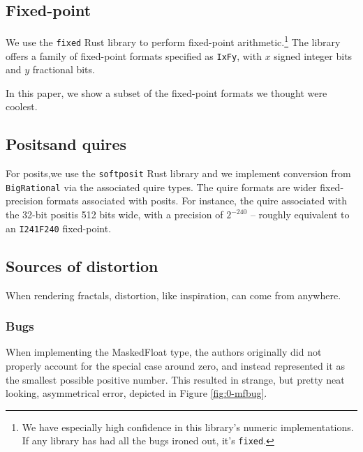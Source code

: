 \documentclass[sigconf,authorversion,nonacm]{acmart}
\begin{document}
\setcounter{subsection}{24}
\subsection{Fixed-point}

We use the \texttt{fixed} Rust library \cite{rust:fixed} to perform fixed-point arithmetic.\footnote{We have especially high confidence in this library's numeric implementations. If any library has had all the bugs ironed out, it's \texttt{fixed}.}
The library offers a family of fixed-point formats specified as \texttt{IxFy}, with $x$ signed integer bits and $y$ fractional bits.

In this paper, we show a subset of the fixed-point formats we thought were coolest.

\setcounter{subsection}{374}
\subsection{Posits\texttrademark and quires}

For posits,\texttrademark we use the \texttt{softposit} Rust library\cite{rust:softposit}
and we implement conversion from \texttt{BigRational} via the associated quire
types. The quire formats are wider fixed-precision formats associated with posits\texttrademark.
For instance, the quire associated with the 32-bit posit\texttrademark is 512 bits wide, with a precision
of $2^{-240}$ -- roughly equivalent to an \texttt{I241F240} fixed-point.

\setcounter{subsection}{4}
\subsection{Sources of distortion}

When rendering fractals, distortion, like inspiration, can come from anywhere.

\setcounter{subsubsection}{19921874}
\subsubsection{Bugs}

When implementing the MaskedFloat type, the authors originally did not properly account for the special case around zero, and instead represented it as the smallest possible positive number. This resulted in strange, but pretty neat looking, asymmetrical error,
depicted in Figure \ref{fig:0-mfbug}.

\end{document}
